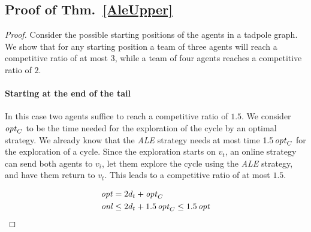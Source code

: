 \subsection{Proof of Thm.~\ref{AleUpper}}\label{proofAleUpper}
\begin{proof} Consider the possible starting positions of the agents in a tadpole graph. We show that for any starting position a team of three agents will
    reach a competitive ratio of at most $3$, while a team of four agents reaches a competitive ratio of $2$.

\paragraph*{Starting at the end of the tail}
In this case two agents suffice to reach a competitive ratio of $1.5$. We consider $\mathop{\mathit{opt}}\nolimits_C$ to be the time needed for the exploration of the cycle by an optimal strategy.
We already know that the \textit{ALE} strategy needs at most time $1.5\mathop{\mathit{opt}}\nolimits_C$ for the exploration of a cycle. Since the exploration starts on $v_t$, an online strategy can send both agents
to $v_i$, let them explore the cycle using the \textit{ALE} strategy, and have them return to $v_t$. This leads to a competitive ratio of at most $1.5$.

\begin{align*}
    \mathop{\mathit{opt}}\nolimits &= 2d_t + \mathop{\mathit{opt}}\nolimits_C\\
    \mathop{\mathit{onl}}\nolimits &\leq 2d_t + 1.5\mathop{\mathit{opt}}\nolimits_C \leq 1.5\mathop{\mathit{opt}}\nolimits
\end{align*}


\end{proof}
